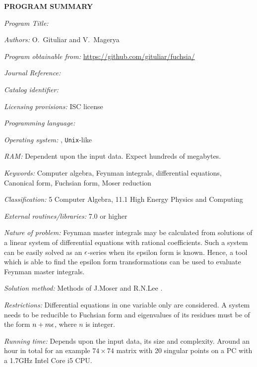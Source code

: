 {\bf PROGRAM SUMMARY}

\begin{small}
\noindent

{\em Program Title:}
    \fuchsia

{\em Authors:}
    O.~Gituliar and V.~Magerya

{\em Program obtainable from:}
    \url{https://github.com/gituliar/fuchsia/}

{\em Journal Reference:}

{\em Catalog identifier:}

{\em Licensing provisions:}
    ISC license

{\em Programming language:}

{\em Operating system:}
    \linux, \texttt{Unix}-like

{\em RAM:}
    Dependent upon the input data. Expect hundreds of megabytes.

{\em Keywords:}
    Computer algebra, Feynman integrals, differential equations, Canonical form, Fuchsian form, Moser reduction

{\em Classification:}
    5 Computer Algebra, 11.1 High Energy Physics and Computing

{\em External routines/libraries:}
    \href{http://www.sagemath.org/}{\sage} 7.0 or higher

{\em Nature of problem:}
    Feynman master integrals may be calculated from solutions of a linear system of differential equations with rational coefficients.
    Such a system can be easily solved as an $\epsilon$-series when its epsilon form is known.
    Hence, a tool which is able to find the epsilon form transformations can be used to evaluate Feynman master integrals. 

{\em Solution method:}
    Methods of J.Moser \cite{Mos59} and R.N.Lee \cite{Lee15}.

{\em Restrictions:}
    Differential equations in one variable only are considered.
    A system needs to be reducible to Fuchsian form and eigenvalues of its residues must be of the form $n + m \epsilon$, where $n$ is integer.

{\em Running time:}
    Depends upon the input data, its size and complexity.
    Around an hour in total for an example $74\times74$ matrix with 20 singular points on a PC with a 1.7GHz Intel Core i5 CPU.

\end{small}
